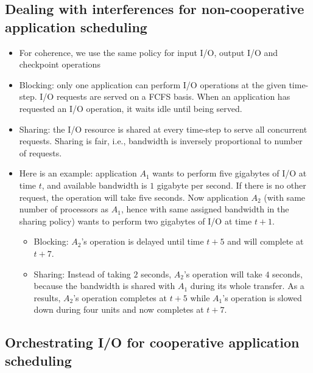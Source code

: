 \documentclass{article}
\begin{document}
\subsection{Dealing with interferences for non-cooperative application scheduling}
\begin{itemize}
  \item For coherence, we use the same policy for input I/O, output I/O and checkpoint operations 
  \item Blocking: only one application can perform I/O operations at the given time-step.
  I/O requests are served on a FCFS basis. When an application has requested an I/O operation, it waits idle until being served.
  \item Sharing: the I/O resource is shared at every time-step to serve all concurrent requests. Sharing is fair, i.e., bandwidth is inversely proportional to number of requests. 
  \item Here is an example:
  application $A_{1}$ wants to perform five gigabytes of I/O at time $t$, 
  and available bandwidth is 
  $1$ gigabyte per second. If there is no other request, the operation will take five seconds.
  Now application $A_{2}$ (with same number of processors as $A_{1}$, hence with same assigned bandwidth in the sharing policy) wants to perform two gigabytes of I/O at time $t+1$.
  \begin{itemize}
  \item Blocking: $A_{2}$'s operation is delayed until time $t+5$ and will complete at $t+7$.
  \item Sharing: Instead of taking $2$ seconds, $A_{2}$'s operation will take $4$ seconds, because the bandwidth is shared with $A_{1}$ during its whole transfer. As a results, $A_{2}$'s operation completes at $t+5$ while $A_{1}$'s  operation is slowed down during four units and now completes at $t+7$.
  \end{itemize}
\end{itemize}

\subsection{Orchestrating I/O for cooperative application scheduling}
\end{document}
